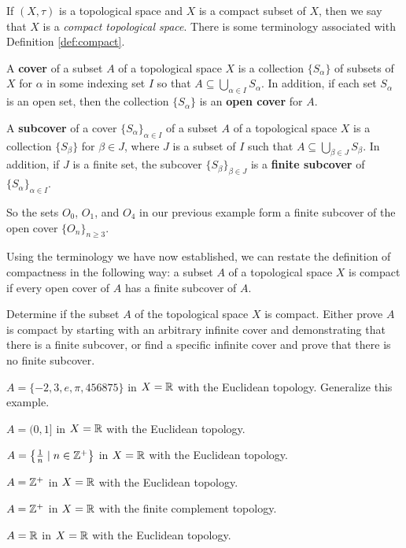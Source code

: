If $(X,\tau)$ is a topological space and $X$ is a compact subset of $X$, then we say that $X$ is a \emph{compact topological space}. There is some terminology associated with Definition \ref{def:compact}.

\begin{definition} A \textbf{cover} of a subset $A$ of a topological space $X$ is a collection $\{S_{\alpha}\}$  of subsets of $X$ for $\alpha$ in some indexing set $I$ so that $A \subseteq \bigcup_{\alpha \in I} S_{\alpha}$. In addition, if each set $S_{\alpha}$ is an open set, then the collection $\{S_{\alpha}\}$ is an \textbf{open cover} for $A$.
\end{definition}

\begin{definition} A \textbf{subcover} of a cover $\{S_{\alpha}\}_{\alpha \in I}$ of a subset $A$ of a topological space $X$ is a collection $\{S_{\beta}\}$ for $\beta \in J$, where $J$ is a subset of $I$ such that $A \subseteq \bigcup_{\beta \in J} S_{\beta}$. In addition, if $J$ is a finite set, the subcover $\{S_{\beta}\}_{\beta \in J}$ is a \textbf{finite subcover} of $\{S_{\alpha}\}_{\alpha \in I}$.
\end{definition}

So the sets $O_0$, $O_1$, and $O_4$ in our previous example form a finite subcover of the open cover $\{O_n\}_{n \geq 3}$. 

Using the terminology we have now established, we can restate the definition of compactness in the following way: a subset $A$ of a topological space $X$ is compact if every open cover of $A$ has a finite subcover of $A$.

\begin{pa} Determine if the subset $A$ of the topological space $X$ is compact. Either prove $A$ is compact by starting with an arbitrary infinite cover and demonstrating that there is a finite subcover, or find a specific infinite cover and prove that there is no finite subcover.
\be
\item $A = \{-2, 3, e, \pi, 456875\}$ in $X = \mathbb{R}$ with the Euclidean topology. Generalize this example.

\item $A = (0, 1]$ in $X = \mathbb{R}$ with the Euclidean topology.

\item $A = \left\{\frac{1}{n} \mid n \in \mathbb{Z}^+\right\}$ in $X = \mathbb{R}$ with the Euclidean topology.

\item $A = \mathbb{Z}^+$ in $X = \mathbb{R}$ with the Euclidean topology.

\item $A = \mathbb{Z}^+$ in $X = \mathbb{R}$ with the finite complement topology.

\item $A = \mathbb{R}$ in $X = \mathbb{R}$ with the Euclidean topology.

\ee

\end{pa}

